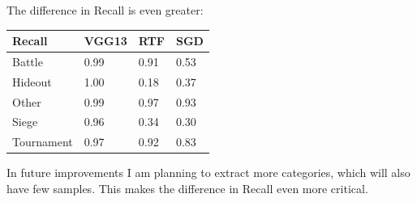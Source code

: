 \documentclass[
]{article}
\begin{document}
The difference in Recall is even greater:

\begin{longtable}[]{@{}llll@{}}
\toprule
Recall & VGG13 & RTF & SGD\tabularnewline
\midrule
\endhead
Battle & 0.99 & 0.91 & 0.53\tabularnewline
Hideout & 1.00 & 0.18 & 0.37\tabularnewline
Other & 0.99 & 0.97 & 0.93\tabularnewline
Siege & 0.96 & 0.34 & 0.30\tabularnewline
Tournament & 0.97 & 0.92 & 0.83\tabularnewline
\bottomrule
\end{longtable}

In future improvements I am planning to extract more categories, which
will also have few samples. This makes the difference in Recall even
more critical.
\end{document}
